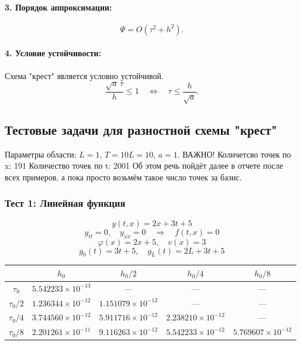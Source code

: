\documentclass[12pt,a4paper]{article}
\begin{document}
\paragraph{3. Порядок аппроксимации:}

\[
\Psi = O(\tau^2 + h^2).
\]

\paragraph{4. Условие устойчивости:}

Схема "крест" является условно устойчивой. 
\[
\frac{\sqrt{a}\,\tau}{h} \leqslant 1 \quad \Leftrightarrow \quad \tau \leqslant \frac{h}{\sqrt{a}}.
\]

\subsection{Тестовые задачи для разностной схемы "крест"}
Параметры области: $L = 1$, $T = 10L = 10$, $a = 1$.
ВАЖНО! Количетсво точек по x: 191
Количество точек по t: 2001
Об этом речь пойдёт далее в отчете после всех примеров, а пока просто возьмём такое число точек за базис.

\subsubsection{Тест 1: Линейная функция}
\[
y(t,x) = 2x + 3t + 5
\]
\[
y_{tt} = 0,\quad y_{xx} = 0 \quad\Rightarrow\quad f(t,x) = 0
\]
\[
\varphi(x) = 2x + 5,\quad v(x) = 3
\]
\[
g_0(t) = 3t + 5,\quad g_L(t) = 2L + 3t + 5
\]



\centering
{}
\begin{tabular}{c|c|c|c|c}
\hline
& $h_0$ & $h_0/2$ & $h_0/4$ & $h_0/8$ \\
\hline
$\tau_0$ & $5.542233 \times 10^{-13}$ & --- & --- & --- \\
$\tau_0/2$ & $1.236344 \times 10^{-12}$ & $1.151079 \times 10^{-12}$ & --- & --- \\
$\tau_0/4$ & $3.744560 \times 10^{-12}$ & $5.911716 \times 10^{-12}$ & $2.238210 \times 10^{-12}$ & --- \\
$\tau_0/8$ & $2.201261 \times 10^{-11}$ & $9.116263 \times 10^{-12}$ & $5.542233 \times 10^{-12}$ & $5.769607 \times 10^{-12}$ \\
\hline
\end{tabular}

\medskip
\end{document}
